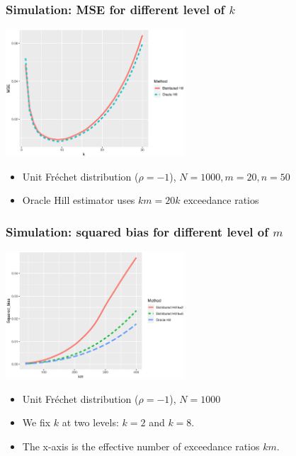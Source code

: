 \documentclass{beamer}
\begin{document}
\begin{frame}
    \frametitle{Simulation: MSE for different level of $k$}
    \begin{center}
         \includegraphics[width = 0.5\textwidth]{Simulation/Frechet_20_50_choice_d_mse.eps} 
    \end{center}
    \begin{itemize}
        \item Unit Fr\'echet distribution ($\rho=-1$), $N=1000, m=20,n=50$
        \item Oracle Hill estimator uses $km =20k$ exceedance ratios
    \end{itemize}
\end{frame}


\begin{frame}
    \frametitle{Simulation: squared bias for different level of $m$}
    \begin{center}
        \includegraphics[width = 0.5\textwidth]{Simulation/Frechet_oracle_bias.eps} 
    \end{center}
    \begin{itemize}
        \item Unit Fr\'echet distribution ($\rho=-1$), $N=1000$
        \item We fix $k$ at two levels: $k=2$ and $k=8$.
        \item The x-axis is the effective number of exceedance ratios $km$.
    \end{itemize}

\end{frame}
\end{document}
